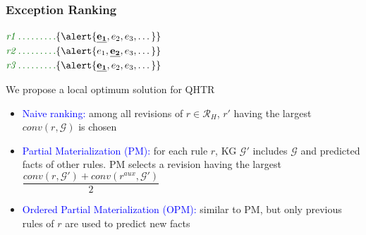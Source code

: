 \documentclass{beamer}
\newcommand{\bl}[1]{\textcolor{blue}{#1}}
\newcommand{\gr}[1]{\textcolor{darkgreen}{#1}}
\def\cG{\ensuremath{\mathcal{G}}}
\def\cR{\ensuremath{\mathcal{R}}}
\newcommand{\mi}[1]{\ensuremath{\mathit{#1}}}
\begin{document}
\begin{frame}\frametitle{Exception Ranking}

\begin{center}
$\gr{\mi{r1} \dotsc \dotsc \dotsc} \{\alert{\underline{\mathbf{e_1}},e_2,e_3, \dotsc}\}$\\
 $\gr{\mi{r2} \dotsc \dotsc \dotsc} \{\alert{e_1,\underline{\mathbf{e_2}},e_3, \dotsc}\}$\\
 $\gr{\mi{r3} \dotsc \dotsc \dotsc} \{\alert{\underline{\mathbf{e_1}},e_2,e_3, \dotsc}\}$\\
\end{center}
\bigskip
\begin{beamerboxesrounded}[upper=uppercolred,lower=lowercolred,shadow=true]{}
We propose a local optimum solution for QHTR~\cite{rumis}
\end{beamerboxesrounded}
\begin{itemize}
\item \bl{Naive ranking:} among all revisions of $r\in \cR_{H}$, $r'$ having the largest $\mi{conv}(r,\cG)$ is chosen

\bigskip
\bigskip

\item \bl{Partial Materialization (PM):} for each rule $r$, KG $\cG'$ includes $\cG$ and predicted facts of other rules. PM selects a revision having the largest $\dfrac{\mi{conv(r,\cG')+conv(r^{aux},\cG')}}{2}$


\bigskip
\bigskip

\item \bl{Ordered Partial Materialization (OPM):} similar to PM, but only previous rules of $r$ are used to predict new facts
\end{itemize}

\end{frame}
\end{document}
